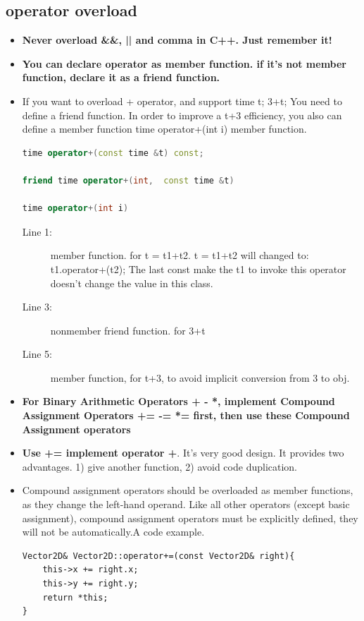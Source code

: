 \documentclass[a4paper,11pt,twoside]{book}
\begin{document}
\subsection{operator overload}
\begin{itemize}
	\item \textbf{Never overload \&\&, || and comma in C++.  Just remember it!}
	
	\item \textbf{You can declare operator as member function. if it's not member function, declare it as a friend function.}
	
		\item If you want to overload + operator, and support time t; 3+t;   You need to define a friend function. In order to improve a t+3 efficiency, you also can define a member function time operator+(int i) member function.
\begin{lstlisting}[frame=single, language=c++]
time operator+(const time &t) const;

friend time operator+(int,  const time &t)

time operator+(int i)
\end{lstlisting}
\begin{description}
	\item[Line 1:] member function. for t = t1+t2. t = t1+t2 will changed to:  t1.operator+(t2);  The last const make the t1 to invoke this operator doesn't change the value in this class. 
	
	\item[Line 3:] nonmember friend function. for 3+t
	
	\item[Line 5:] member function, for t+3, to avoid implicit conversion from 3 to obj.
\end{description}
	
	\item \textbf{For Binary Arithmetic Operators + - *, implement Compound Assignment Operators += -= *= first, then use these Compound Assignment operators}
	
	\item \textbf{Use += implement operator +}. It's very good design. It provides two advantages. 1) give another function, 2) avoid code duplication. 
	
	\item Compound assignment operators should be overloaded as member functions, as they change the left-hand operand. Like all other operators (except basic assignment), compound assignment operators must be explicitly defined, they will not be automatically.A code example. 
\begin{lstlisting}[numbers=none]
Vector2D& Vector2D::operator+=(const Vector2D& right){
	this->x += right.x;
	this->y += right.y;
	return *this;
}
\end{lstlisting}
	

\end{itemize}
\end{document}
